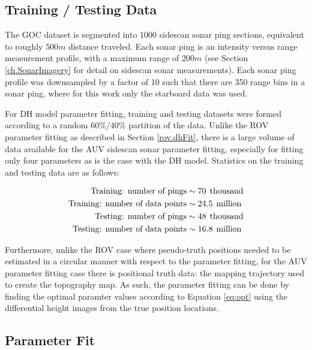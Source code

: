 \subsection{Training / Testing Data}
\label{auv.Field.Training}

The GOC dataset is segmented into 1000 sidescan sonar ping sections, equivalent to roughly $500m$ distance traveled. 
Each sonar ping is an intensity versus range measurement profile, with a maximum range of $200m$ (see Section \ref{ch.SonarImagery} for detail on sidescan sonar measurements).
Each sonar ping profile was downsampled by a factor of 10 such that there are 350 range bins in a sonar ping, where for this work only the starboard data was used.

For DH model parameter fitting, training and testing datasets were formed according to a random 60\%/40\% partition of the data.
Unlike the ROV parameter fitting as described in Section \ref{rov.dhFit}, there is a large volume of data available for the AUV sidescan sonar parameter fitting, especially for fitting only four parameters as is the case with the DH model.
Statistics on the training and testing data are as follows:

\begin{align*}
\begin{split}
\text{Training: number of pings} &\sim 70 \hspace{1ex} \text{thousand} \\
\text{Training: number of data points} &\sim 24.5 \hspace{1ex} \text{million} \\
\text{Testing: number of pings} &\sim 48 \hspace{1ex} \text{thousand} \\
\text{Testing: number of data points} &\sim 16.8 \hspace{1ex} \text{million}
\end{split}
\end{align*}

Furthermore, unlike the ROV case where pseudo-truth positions needed to be estimated in a circular manner with respect to the parameter fitting, for the AUV parameter fitting case there is positional truth data: the mapping trajectory used to create the topography map. 
As such, the parameter fitting can be done by finding the optimal paramter values according to Equation \ref{eq:opt} using the differential height images from the true position locations.

\subsection{Parameter Fit}
\label{auv.dhFit.Parameter}

